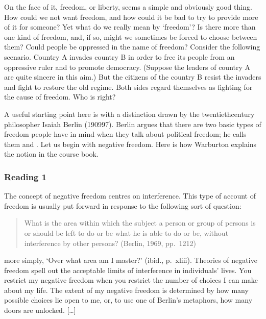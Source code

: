 \documentclass[letterpaper,10pt,english]{sphinxmanual}
\begin{document}
On the face of it, freedom, or liberty, seems a simple and obviously good thing. How could we not want freedom, and how could it be bad to try to provide more of it for someone? Yet what do we really mean by ‘freedom’? Is there more than one kind of freedom, and, if so, might we sometimes be forced to choose between them? Could people be oppressed in the name of freedom? Consider the following scenario. Country A invades country B in order to free its people from an oppressive ruler and to
promote democracy. (Suppose the leaders of country A are quite sincere in this aim.) But the citizens of the country B resist the invaders and fight to restore the old regime. Both sides regard themselves as fighting for the cause of freedom. Who is right?

A useful starting point here is with a distinction drawn by the twentieth\sphinxhyphen{}century philosopher Isaiah Berlin (1909\textendash{}97). Berlin argues that there are two basic types of freedom people have in mind when they talk about political freedom; he calls them  and . Let us begin with negative freedom. Here is how Warburton explains the notion in the course book.


\subsubsection{Reading 1}
\label{\detokenize{content/session_00/Part_00_02:Reading-1}}
The concept of negative freedom centres on  interference. This type of account of freedom is usually put forward in response to the following sort of question:


\begin{quote}

What is the area within which the subject \textendash{} a person or group of persons \textendash{} is or should be left to do or be what he is able to do or be, without interference by other persons? (Berlin, 1969, pp. 121\textendash{}2)
\end{quote}

more simply, ‘Over what area am I master?’ (ibid., p. xliii). Theories of negative freedom spell out the acceptable limits of interference in individuals’ lives. You restrict my negative freedom when you restrict the number of choices I can make about my life. The extent of my negative freedom is determined by how many possible choices lie open to me, or, to use one of Berlin’s metaphors, how many doors are unlocked. {[}…{]}
\end{document}
